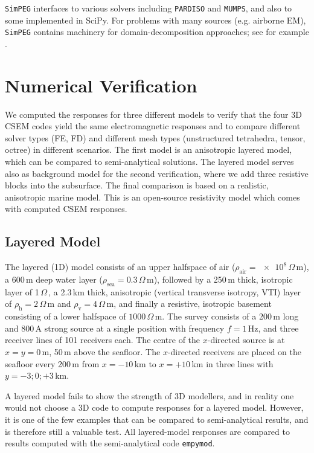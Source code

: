 \documentclass[
    paper,
  ]{geophysics}
\newcommand{\empymod}{\texttt{empymod}\xspace}
\newcommand{\simpeg}{\texttt{SimPEG}\xspace}
\newcommand{\ohmm}{\ensuremath{\Omega\,}\text{m}\xspace}
\begin{document}
\simpeg interfaces to various solvers including \texttt{PARDISO} and \texttt{MUMPS}, and also to some implemented in SciPy. For problems with many sources (e.g. airborne EM), \simpeg contains machinery for domain-decomposition approaches; see for example \cite{GEO.20.Fournier}.

\section{Numerical Verification}

We computed the responses for three different models to verify that the four 3D CSEM codes yield the same electromagnetic responses and to compare different solver types (FE, FD) and different mesh types (unstructured tetrahedra, tensor, octree) in different scenarios. The first model is an anisotropic layered model, which can be compared to semi-analytical solutions. The layered model serves also as background model for the second verification, where we add three resistive blocks into the subsurface. The final comparison is based on a realistic, anisotropic marine model. This is an open-source resistivity model which comes with computed CSEM responses.

\subsection{Layered Model}

The layered (1D) model consists of an upper halfspace of air ($\rho_\text{air}=\num{e8}\,\ohmm$), a 600\,m deep water layer ($\rho_\text{sea}=\num{0.3}\,\ohmm$), followed by a 250\,m thick, isotropic layer of 1\,\ohmm, a 2.3\,km thick, anisotropic (vertical transverse isotropy, VTI) layer of $\rho_\text{h}=2\,\ohmm$ and $\rho_\text{v}=4\,\ohmm$, and finally a resistive, isotropic basement consisting of a lower halfspace of $1000\,\ohmm$. The survey consists of a 200\,m long and 800\,A strong source at a single position with frequency $f=1\,$Hz, and three receiver lines of 101 receivers each. The centre of the $x$-directed source is at $x=y=0\,$m, 50\,m above the seafloor. The $x$-directed receivers are placed on the seafloor every 200\,m from $x=-10\,$km to $x=+10\,$km in three lines with $y=-3; 0; +3\,$km.


A layered model fails to show the strength of 3D modellers, and in reality one would not choose a 3D code to compute responses for a layered model. However, it is one of the few examples that can be compared to semi-analytical results, and is therefore still a valuable test. All layered-model responses are compared to results computed with the semi-analytical code \empymod\citep{GEO.17.Werthmuller}.
\end{document}
